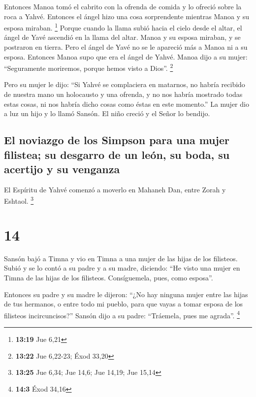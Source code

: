 Entonces Manoa tomó el cabrito con la ofrenda de comida
y lo ofreció sobre la roca a Yahvé. Entonces el ángel hizo una cosa
sorprendente mientras Manoa y su esposa miraban. \footnote{\textbf{13:19}
  Jue 6,21}  Porque cuando la llama subió hacia el cielo
desde el altar, el ángel de Yavé ascendió en la llama del altar. Manoa y
su esposa miraban, y se postraron en tierra.  Pero el
ángel de Yavé no se le apareció más a Manoa ni a su esposa. Entonces
Manoa supo que era el ángel de Yahvé.  Manoa dijo a su
mujer: ``Seguramente moriremos, porque hemos visto a Dios''. \footnote{\textbf{13:22}
  Jue 6,22-23; Éxod 33,20}

 Pero su mujer le dijo: ``Si Yahvé se complaciera en
matarnos, no habría recibido de nuestra mano un holocausto y una
ofrenda, y no nos habría mostrado todas estas cosas, ni nos habría dicho
cosas como éstas en este momento.''  La mujer dio a luz
un hijo y lo llamó Sansón. El niño creció y el Señor lo bendijo.

\hypertarget{el-noviazgo-de-los-simpson-para-una-mujer-filistea-su-desgarro-de-un-leuxf3n-su-boda-su-acertijo-y-su-venganza}{%
\subsection{El noviazgo de los Simpson para una mujer filistea; su
desgarro de un león, su boda, su acertijo y su
venganza}\label{el-noviazgo-de-los-simpson-para-una-mujer-filistea-su-desgarro-de-un-leuxf3n-su-boda-su-acertijo-y-su-venganza}}

 El Espíritu de Yahvé comenzó a moverlo en Mahaneh Dan,
entre Zorah y Eshtaol. \footnote{\textbf{13:25} Jue 6,34; Jue 14,6; Jue
  14,19; Jue 15,14}

\hypertarget{section-13}{%
\section{14}\label{section-13}}

 Sansón bajó a Timna y vio en Timna a una mujer de las
hijas de los filisteos.  Subió y se lo contó a su padre y
a su madre, diciendo: ``He visto una mujer en Timna de las hijas de los
filisteos. Consíguemela, pues, como esposa''.

 Entonces su padre y su madre le dijeron: ``¿No hay
ninguna mujer entre las hijas de tus hermanos, o entre todo mi pueblo,
para que vayas a tomar esposa de los filisteos incircuncisos?'' Sansón
dijo a su padre: ``Tráemela, pues me agrada''. \footnote{\textbf{14:3}
  Éxod 34,16}

